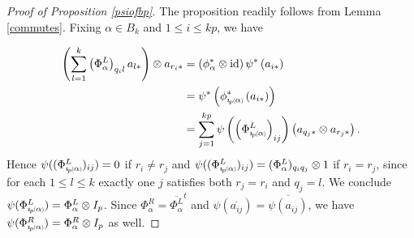 \documentclass[11pt]{amsart}
\newcommand*{\subsmallp}[1]{\scalebox{.5}{\ensuremath#1}}
\newcommand{\subpp}[2][p]{\imath_{\hspace*{-1pt}#1}\hspace*{-.5pt}\subsmallp(#2\subsmallp)}
\newcommand\id{\operatorname{id}}
\theoremstyle{definition}
\begin{document}
\begin{proof}[Proof of Proposition \ref{psiofbp}]
The proposition readily follows from Lemma \ref{commutes}. Fixing $\alpha\in B_{k}$ and $1\le i\le kp$, we have

\begin{align*}
\left(\sum_{l=1}^k \left(\Phi_\alpha^L\right)_{q_il}a_{l*}\right)\otimes a_{r_i*} &= \left(\phi^\ast_{\alpha}\otimes \id\right)\psi^\ast\left(a_{i*}\right)\\
&= \psi^\ast\left(\phi^\ast_{\subpp{\alpha}}\left(a_{i*}\right)\right)\\
&= \sum_{j=1}^{kp} \psi\left(\left(\Phi_{\subpp{\alpha}}^L\right)_{ij}\right)\left(a_{q_j*}\otimes a_{r_j*}\right).\\
\end{align*}
Hence $\psi((\Phi_{\subpp{\alpha}}^L)_{ij}) = 0$ if $r_i \ne r_j$ and $\psi((\Phi_{\subpp{\alpha}}^L)_{ij}) = (\Phi_\alpha^L)_{q_iq_j}\otimes 1$ if $r_i = r_j$, since for each $1\le l\le k$ exactly one $j$ satisfies both $r_j=r_i$ and $q_j=l$. We conclude $\psi(\Phi_{\subpp{\alpha}}^L) = \Phi_\alpha^L\otimes I_p$. Since $\Phi_\alpha^R = \overline{\Phi_\alpha^L}^t$ and $\psi(\overline{a_{ij}}) = \overline{\psi(a_{ij})}$, we have $\psi(\Phi_{\subpp{\alpha}}^R) = \Phi_\alpha^R\otimes I_p$ as well.
\end{proof}
\end{document}
